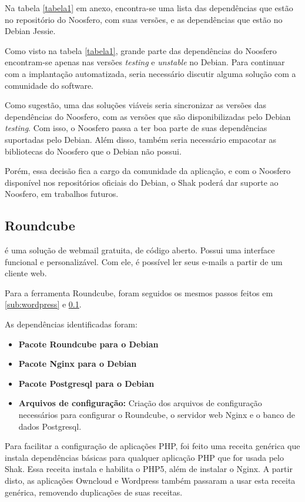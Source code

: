 Na tabela \ref{tabela1} em anexo, encontra-se uma lista das dependências 
que estão no repositório do Noosfero,
com suas versões, e as dependências que estão no Debian Jessie.

Como visto na tabela \ref{tabela1}, grande parte das dependências do Noosfero encontram-se
 apenas nas versões \textit{testing} e \textit{unstable} no Debian. Para continuar com
a implantação automatizada, seria necessário discutir alguma solução 
com a comunidade do software. 

Como sugestão, uma das soluções viáveis seria 
sincronizar as versões das dependências do Noosfero, com as versões que são 
disponibilizadas pelo Debian \textit{testing}. Com isso, o 
Noosfero passa a ter boa parte de suas dependências suportadas pelo Debian. Além disso, 
também seria necessário empacotar as bibliotecas do Noosfero que o Debian não possui. 

Porém, essa decisão fica a cargo da comunidade da aplicação, e com o Noosfero disponível
nos repositórios oficiais do Debian, o Shak poderá dar suporte ao Noosfero, 
em trabalhos futuros.

 \subsection{Roundcube}
\label{sub:owncloud}

 é uma solução de webmail gratuita, de código 
aberto. Possui uma interface funcional e personalizável. Com ele, é possível
ler seus e-mails a partir de um cliente web. 

Para a ferramenta Roundcube, foram seguidos os mesmos passos feitos em 
\ref{sub:wordpress} e \ref{sub:owncloud}.

As dependências identificadas foram:

\begin{itemize}
   \item \textbf{Pacote Roundcube para o Debian}
   \item \textbf{Pacote Nginx para o Debian}
   \item \textbf{Pacote Postgresql para o Debian}
   \item \textbf{Arquivos de configuração:} Criação dos arquivos de configuração
   necessários para configurar o Roundcube, o servidor web Nginx e o banco de dados
   Postgresql.
\end{itemize}

Para facilitar a configuração de aplicações PHP, foi feito uma receita genérica
que instala dependências básicas para qualquer aplicação PHP que for usada pelo
Shak. Essa receita instala e habilita o PHP5, além de instalar o Nginx. A partir
disto, as aplicações Owncloud e Wordpress também passaram a usar esta receita
genérica, removendo duplicações de suas receitas.

